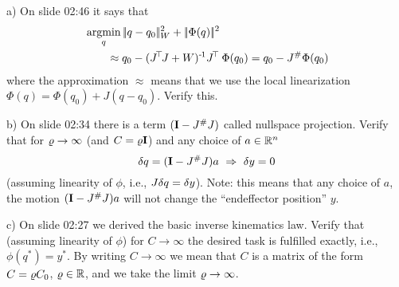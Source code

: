 

\renewcommand{\course}{Robotics}
\renewcommand{\coursepicture}{roboticsLecture}
\renewcommand{\coursedate}{Winter 2014}
\renewcommand{\exnum}{4}

\exercises


\exercisestitle









a) On slide 02:46 it says that
\begin{align*}
&\argmin_q \norm{q-q_0}_W^2 + \norm{\Phi(q)}^2 \\
 &\qquad\approx q_0 - (J^\T J + W)^\1 J^\T~ \Phi(q_0)
 =q_0 - J^\# \Phi(q_0)
\end{align*}
where the approximation $\approx$ means that we use the local
linearization $\Phi(q) = \Phi(q_0) + J (q-q_0)$. Verify this.

b) On slide 02:34 there is a term $({\rm\bf I} - J^\# J)$ called nullspace
 projection. Verify that for $\varrho\to\infty$ (and $C=\varrho{\rm\bf I}$) and any choice
 of $a\in{\mathbb{R}}^n$
$$ \delta q = ({\rm\bf I} - J^\# J) a ~ \Rightarrow ~ \delta y=0 $$
(assuming linearity of $\phi$, i.e., $J \delta q=\delta
y$). Note: this means that any choice of $a$, the motion $({\rm\bf I} - J^\# J) a$ will
not change the ``endeffector position'' $y$.


c) On slide 02:27 we derived the basic inverse kinematics law. Verify
that (assuming linearity of $\phi$) for $C\to\infty$ the desired task
is fulfilled exactly, i.e., $\phi(q^*) = y^*$. By writing $C\to\infty$
we mean that $C$ is a matrix of the form $C=\varrho C_0$, $\varrho\in{\mathbb{R}}$, and
we take the limit $\varrho\to\infty$.


